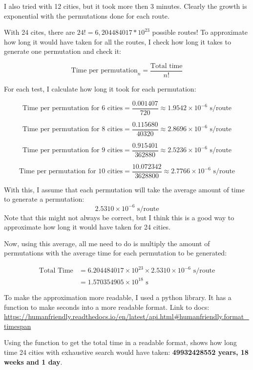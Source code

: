 \documentclass{article}
\begin{document}
    I also tried with 12 cities, but it took more then 3 minutes. Clearly the growth is exponential with the permutations done for each route. 

    With 24 cites, there are $24! = 6,204484017*10^{23}$ possible routes!
    To approximate how long it would have taken for all the routes, I check how long it takes to generate one permutation and check it: 

    \[
    \text{Time per permutation}_n = \frac{\text{Total time}}{n!}
    \]

    For each test, I calculate how long it took for each permutation: 

    \[
    \text{Time per permutation for 6 cities} = \frac{0.001407}{720} \approx 1.9542 \times 10^{-6} \text{ s/route}
    \]

    \[
    \text{Time per permutation for 8 cities} = \frac{0.115680}{40320} \approx 2.8696 \times 10^{-6} \text{ s/route}
    \]

    \[
    \text{Time per permutation for 9 cities} = \frac{0.915401}{362880} \approx 2.5236 \times 10^{-6} \text{ s/route}
    \]

    \[
    \text{Time per permutation for 10 cities} = \frac{10.072342}{3628800} \approx 2.7766 \times 10^{-6} \text{ s/route}
    \]

    With this, I assume that each permutation will take the average amount of time to generate a permutation: \[2.5310\times10^{-6} \text{ s/route} \]
    Note that this might not always be correct, but I think this is a good way to approximate how long it would have taken for 24 cities. 

    Now, using this average, all me need to do is multiply the amount of permutations with the average time for each permutation to be generated: 

    \[
    \begin{aligned}
        \text{Total Time} &= 6.204484017 \times 10^{23} \times 2.5310\times10^{-6} \text{ s/route} \\
                          &= 1.570354905 \times 10^{18} \text{ s}
    \end{aligned}
    \]

    To make the approximation more readable, I used a python library. 
    It has a function to make seconds into a more readable format. Link to docs: 
    \url{https://humanfriendly.readthedocs.io/en/latest/api.html#humanfriendly.format_timespan} \newline

    Using the function to get the total time in a readable format, shows how long time 24 cities with exhaustive search would have taken: \textbf{49932428552 years, 18 weeks and 1 day}.
\end{document}
